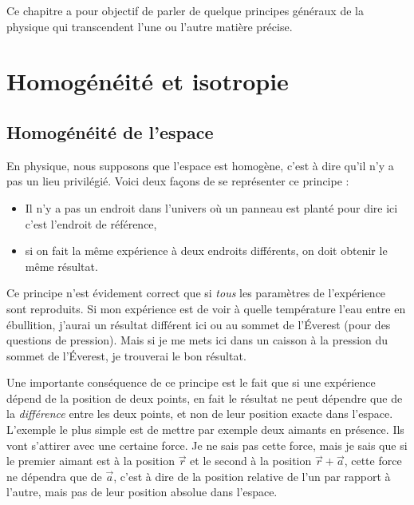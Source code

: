 

Ce chapitre a pour objectif de parler de quelque principes généraux de la physique qui transcendent l'une ou l'autre matière précise.

\section{Homogénéité et isotropie}

\subsection{Homogénéité de l'espace}

En physique, nous supposons que l'espace est homogène, c'est à dire qu'il n'y a pas un lieu privilégié. Voici deux façons de se représenter ce principe :
\begin{itemize}
\item Il n'y a pas un endroit dans l'univers où un panneau est planté pour dire \og ici c'est l'endroit de référence\fg,
\item si on fait la même expérience à deux endroits différents, on doit obtenir le même résultat.
\end{itemize}


Ce principe n'est évidement correct que si \emph{tous} les paramètres de l'expérience sont reproduits. Si mon expérience est de voir à quelle température l'eau entre en ébullition, j'aurai un résultat différent ici ou au sommet de l'Éverest (pour des questions de pression). Mais si je me mets ici dans un caisson à la pression du sommet de l'Éverest, je trouverai le bon résultat.

Une importante conséquence de ce principe est le fait que si une expérience dépend de la position de deux points, en fait le résultat ne peut dépendre que de la \emph{différence} entre les deux points, et non de leur position exacte dans l'espace. L'exemple le plus simple est de mettre par exemple deux aimants en présence. Ils vont s'attirer avec une certaine force. Je ne sais pas cette force, mais je sais que si le premier aimant est à la position $\overrightarrow{ r }$ et le second à la position $\overrightarrow{ r }+ \overrightarrow{ a }$, cette force ne dépendra que de $\overrightarrow{ a }$, c'est à dire de la position relative de l'un par rapport à l'autre, mais pas de leur position absolue dans l'espace.

